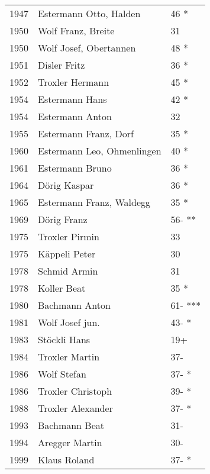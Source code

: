 {\begin{longtable}{ l l l }
        1947          & Estermann Otto,  Halden       & 46 *        \\
        1950          & Wolf Franz, Breite            & 31          \\
        1950          & Wolf Josef, Obertannen        & 48 *        \\
        1951          & Disler Fritz                  & 36 *        \\
        1952          & Troxler Hermann               & 45 *        \\
        1954          & Estermann Hans                & 42 *        \\
        1954          & Estermann Anton               & 32          \\
        1955          & Estermann Franz, Dorf         & 35 *        \\
        1960          & Estermann Leo, Ohmenlingen    & 40 *        \\
        1961          & Estermann Bruno               & 36 *        \\
        1964          & Dörig Kaspar                  & 36 *        \\
        1965          & Estermann Franz, Waldegg      & 35 *        \\
        1969          & Dörig Franz                   & 56- **      \\
        1975          & Troxler Pirmin                & 33          \\
        1975          & Käppeli Peter                 & 30          \\
        1978          & Schmid Armin                  & 31          \\
        1978          & Koller Beat                   & 35 *        \\
        1980          & Bachmann Anton                & 61- ***     \\
        1981          & Wolf Josef jun.               & 43- *       \\
        1983          & Stöckli Hans                  & 19+         \\
        1984          & Troxler Martin                & 37-         \\
        1986          & Wolf Stefan                   & 37- *       \\
        1986          & Troxler Christoph             & 39- *       \\
        1988          & Troxler Alexander             & 37- *       \\
        1993          & Bachmann Beat                 & 31-         \\
        1994          & Aregger Martin                & 30-         \\
        1999          & Klaus Roland                  & 37- *       \\
    \end{longtable}
    \unskip
    \unpenalty
    \unpenalty}

